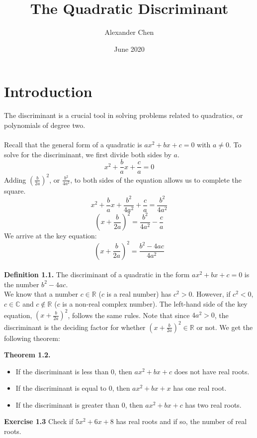 \documentclass{article}
\title{The Quadratic Discriminant}
\author{Alexander Chen}
\date{June 2020}
\begin{document}
\maketitle

\section{Introduction}
The discriminant is a crucial tool in solving problems related to quadratics, or polynomials of degree two.\\\\

Recall that the general form of a quadratic is $ax^2+bx+c=0$ with $a\neq0$. To solve for the discriminant, we first divide both sides by $a$. $$x^2+\frac{b}{a}x+\frac{c}{a}=0$$
Adding $(\frac{b}{2a})^2$, or $\frac{b^2}{4a^2}$, to both sides of the equation allows us to complete the square.
$$x^2+\frac{b}{a}x+\frac{b^2}{4a^2}+\frac{c}{a}=\frac{b^2}{4a^2}$$
$$(x+\frac{b}{2a})^2=\frac{b^2}{4a^2}-\frac{c}{a}$$
We arrive at the key equation:
$$(x+\frac{b}{2a})^2=\frac{b^2-4ac}{4a^2}$$\\

\textbf{Definition 1.1.} The discriminant of a quadratic in the form $ax^2+bx+c=0$ is the number $b^2-4ac$.\\

We know that a number $c \in \mathbb{R}$ ($c$ is a real number) has $c^2>0$. However, if $c^2<0$, $c \in \mathbb{C}$ and $c \not\in \mathbb{R}$ ($c$ is a non-real complex number). The left-hand side of the key equation, $(x+\frac{b}{2a})^2$, follows the same rules. Note that since $4a^2 > 0$, the discriminant is the deciding factor for whether $(x+\frac{b}{2a})^2 \in \mathbb{R}$ or not. We get the following theorem:\\

\begin{mdframed}
    \textbf{Theorem 1.2.}
    \begin{itemize}
        \item If the discriminant is less than 0, then $ax^2+bx+c$ does not have real roots.
        \item If the discriminant is equal to 0, then $ax^2+bx+x$ has one real root.
        \item If the discriminant is greater than 0, then $ax^2+bx+c$ has two real roots.
    \end{itemize}
\end{mdframed}

\textbf{Exercise 1.3} Check if $5x^2+6x+8$ has real roots and if so, the number of real roots.
\end{document}
